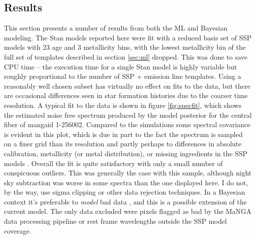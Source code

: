 \documentclass[modern]{aastex62}
\begin{document}
\subsection{Results}
\label{sec:results}

This section presents a number of results from both the ML and Bayesian modeling. The Stan models reported here were fit with a reduced basis set of SSP models with 23 age and 3 metallicity bins, with the lowest metallicity bin of the full set of templates described in section \ref{sec:ml} dropped. This was done to save CPU time -- the execution time for a single Stan model is highly variable but roughly proportional to the number of SSP + emission line templates. Using a reasonably well chosen subset has virtually no effect on fits to the data, but there are occasional differences seen in star formation histories due to the coarser time resolution. A typical fit to the data is shown in figure \ref{fig:specfit}, which shows the estimated noise free spectrum produced by the model posterior for the central fiber of mangaid 1-256002. Compared to the simulations some spectral covariance is evident in this plot, which is due in part to the fact the spectrum is sampled on a finer grid than its resolution and partly perhaps to differences in absolute calibration, metallicity (or metal distribution), or missing ingredients in the SSP models \citep{2013ARA&A..51..393C}. Overall the fit is quite satisfactory with only a small number of conspicuous outliers. This was generally the case with this sample, although night sky subtraction was worse in some spectra than the one displayed here. I do not, by the way, use sigma clipping or other data rejection techniques. In a Bayesian context it's preferable to \emph{model} bad data \citep{2010arXiv1008.4686H}, and this is a possible extension of the current model. The only data excluded were pixels flagged as bad by the MaNGA data processing pipeline or rest frame wavelengths outside the SSP model coverage.
\end{document}
